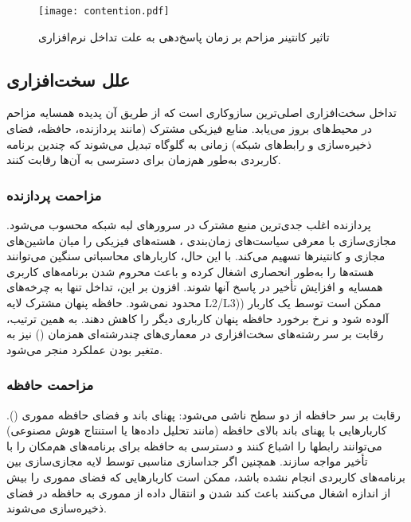 \vspace{0.5cm}
\begin{figure}[h]
\centering
\texttt{[image: contention.pdf]}
\caption{تاثیر کانتینر مزاحم بر زمان پاسخ‌دهی به علت تداخل نرم‌افزاری\cite{sysdig2017isolation}}
\label{figure:software_contention}
\end{figure}
\vspace{0.5cm}

\subsection{علل سخت‌افزاری}

تداخل سخت‌افزاری اصلی‌ترین سازوکاری است که از طریق آن پدیده همسایه مزاحم در محیط‌های  بروز می‌یابد. منابع فیزیکی مشترک (مانند پردازنده‌، حافظه، فضای ذخیره‌سازی و رابط‌های شبکه) زمانی به گلوگاه تبدیل می‌شوند که چندین برنامه کاربردی به‌طور هم‌زمان برای دسترسی به آن‌ها رقابت کنند.

\subsubsection{مزاحمت پردازنده}

پردازنده اغلب جدی‌ترین منبع مشترک در سرورهای لبه شبکه محسوب می‌شود. مجازی‌سازی با معرفی سیاست‌های زمان‌بندی ، هسته‌های فیزیکی را میان ماشین‌های مجازی و کانتینرها تسهیم‌ می‌کند. با این حال، کاربارهای محاسباتی سنگین می‌توانند هسته‌ها را به‌طور انحصاری اشغال کرده و باعث محروم شدن برنامه‌های کاربری همسایه و افزایش تأخیر در پاسخ آنها شوند. افزون بر این، تداخل تنها به چرخه‌های  محدود نمی‌شود. حافظه پنهان مشترک لایه L2/L3)) ممکن است توسط یک کاربار آلوده شود و نرخ برخورد حافظه پنهان کارباری دیگر را کاهش دهند. به همین ترتیب، رقابت بر سر رشته‌های سخت‌افزاری در معماری‌های چندرشته‌ای همزمان ()  نیز به متغیر بودن عملکرد منجر می‌شود.

\subsubsection{مزاحمت حافظه}

رقابت بر سر حافظه از دو سطح ناشی می‌شود: پهنای باند و فضای حافظه مموری (). کاربارهایی با پهنای باند بالای حافظه (مانند تحلیل داده‌ها یا استنتاج هوش مصنوعی) می‌توانند رابطها را اشباع کنند و دسترسی به حافظه برای برنامه‌های هم‌مکان را با تأخیر مواجه سازند. همچنین اگر جداسازی مناسبی توسط لایه مجازی‌سازی بین برنامه‌های کاربردی انجام نشده باشد، ممکن است کاربارهایی که فضای مموری را بیش از اندازه اشغال می‌کنند باعث کند شدن و انتقال داده از مموری به حافظه  در فضای ذخیره‌سازی  می‌شوند.

